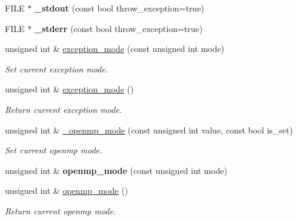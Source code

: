 \begin{DoxyCompactItemize}
\item 
\mbox{\label{namespacecimg__library__suffixed_1_1cimg_a493220746e5df3466568bd7862825008}} 
F\+I\+LE $\ast$ {\bfseries \+\_\+stdout} (const bool throw\+\_\+exception=true)
\item 
\mbox{\label{namespacecimg__library__suffixed_1_1cimg_aab8db7528c32a8fd3a3dc471e662782e}} 
F\+I\+LE $\ast$ {\bfseries \+\_\+stderr} (const bool throw\+\_\+exception=true)
\item 
unsigned int \& \hyperlink{namespacecimg__library__suffixed_1_1cimg_aeafab144366eddd11360f32f468fa4af}{exception\+\_\+mode} (const unsigned int mode)
\begin{DoxyCompactList}\small\item\em Set current  exception mode. \end{DoxyCompactList}\item 
unsigned int \& \hyperlink{namespacecimg__library__suffixed_1_1cimg_a3ee303866379f1c38eb4807afb3c946a}{exception\+\_\+mode} ()
\begin{DoxyCompactList}\small\item\em Return current  exception mode. \end{DoxyCompactList}\item 
unsigned int \& \hyperlink{namespacecimg__library__suffixed_1_1cimg_a2a1f404b2580ad14629ca49e7c5380e5}{\+\_\+openmp\+\_\+mode} (const unsigned int value, const bool is\+\_\+set)
\begin{DoxyCompactList}\small\item\em Set current  openmp mode. \end{DoxyCompactList}\item 
\mbox{\label{namespacecimg__library__suffixed_1_1cimg_aca7e3fd74620730af7d4ae96a22f8dd6}} 
unsigned int \& {\bfseries openmp\+\_\+mode} (const unsigned int mode)
\item 
\mbox{\label{namespacecimg__library__suffixed_1_1cimg_a7863f246fbfd66096d38b08af0a91b31}} 
unsigned int \& \hyperlink{namespacecimg__library__suffixed_1_1cimg_a7863f246fbfd66096d38b08af0a91b31}{openmp\+\_\+mode} ()
\begin{DoxyCompactList}\small\item\em Return current  openmp mode. \end{DoxyCompactList}\item 

\end{DoxyCompactItemize}
